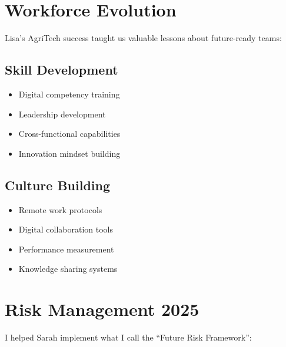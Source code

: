 \section{Workforce Evolution}\label{sec:workforce-evolution}

Lisa's AgriTech success taught us valuable lessons about future-ready teams:

\subsection{Skill Development}\label{subsec:skill-development}
\begin{itemize}
    \item Digital competency training
    \item Leadership development
    \item Cross-functional capabilities
    \item Innovation mindset building
\end{itemize}

\subsection{Culture Building}\label{subsec:culture-building}
\begin{itemize}
    \item Remote work protocols
    \item Digital collaboration tools
    \item Performance measurement
    \item Knowledge sharing systems
\end{itemize}

\section{Risk Management 2025}\label{sec:risk-2025}

I helped Sarah implement what I call the ``Future Risk Framework'':

